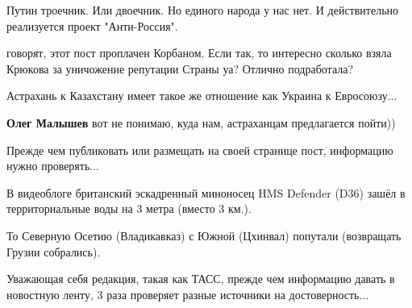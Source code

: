 \begin{itemize}
 
Путин троечник. Или двоечник. Но единого народа у нас нет. И действительно реализуется проект "Анти-Россия".

 
говорят, этот пост проплачен Корбаном. Если так, то интересно сколько взяла Крюкова за уничожение репутации Страны уа? Отлично подработала?

 
Астрахань к Казахстану имеет такое же отношение как Украина к Евросоюзу...

\begin{itemize}
 
\textbf{Олег Малышев} вот не понимаю, куда нам, астраханцам предлагается пойти))

 

Прежде чем публиковать или размещать на своей странице пост, информацию нужно
проверять...

В видеоблоге британский эскадренный миноносец HMS Defender (D36) зашёл в
территориальные воды на 3 метра (вместо 3 км.).

То Северную Осетию (Владикавказ) с Южной (Цхинвал) попутали (возвращать Грузии
собрались).

Уважающая себя редакция, такая как ТАСС, прежде чем информацию давать в
новостную ленту, 3 раза проверяет разные источники на достоверность...

\end{itemize}


\end{itemize}
